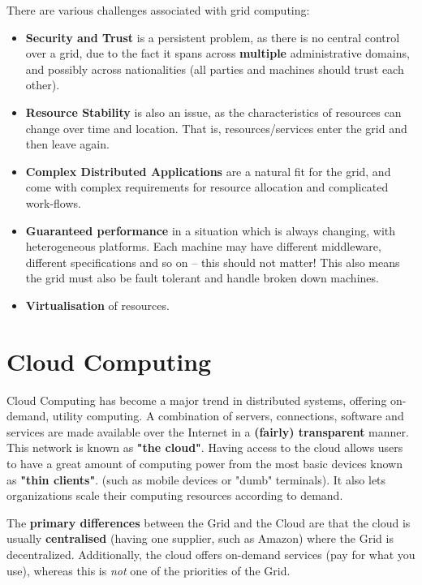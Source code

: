 \documentclass{article}
\begin{document}
There are various challenges associated with grid computing:
\begin{itemize}
	\item \textbf{Security and Trust} is a persistent problem, as there is no central control over a grid, due to the fact it spans across \textbf{multiple} administrative domains, and possibly across nationalities (all parties and machines should trust each other).
	\item \textbf{Resource Stability} is also an issue, as the characteristics of resources can change over time and location. That is, resources/services enter the grid and then leave again.
	\item \textbf{Complex Distributed Applications} are a natural fit for the grid, and come with complex requirements for resource allocation and complicated work-flows.
	\item \textbf{Guaranteed performance} in a situation which is always changing, with heterogeneous platforms. Each machine may have different middleware, different specifications and so on -- this should not matter! This also means the grid must also be fault tolerant and handle broken down machines.
	\item \textbf{Virtualisation} of resources.
\end{itemize}



\section{Cloud Computing}

Cloud Computing has become a major trend in distributed systems, offering on-demand, utility computing. A combination of servers, connections, software and services are made available over the Internet in a \textbf{(fairly) transparent} manner. This network is known as \textbf{"the cloud"}. Having access to the cloud allows users to have a great amount of computing power from the most basic devices known as \textbf{"thin clients"}. (such as mobile devices or "dumb" terminals). It also lets organizations scale their computing resources according to demand.

The \textbf{primary differences} between the Grid and the Cloud are that the cloud is usually \textbf{centralised} (having one supplier, such as Amazon) where the Grid is decentralized. Additionally, the cloud offers on-demand services (pay for what you use), whereas this is \textit{not} one of the priorities of the Grid.
\end{document}
